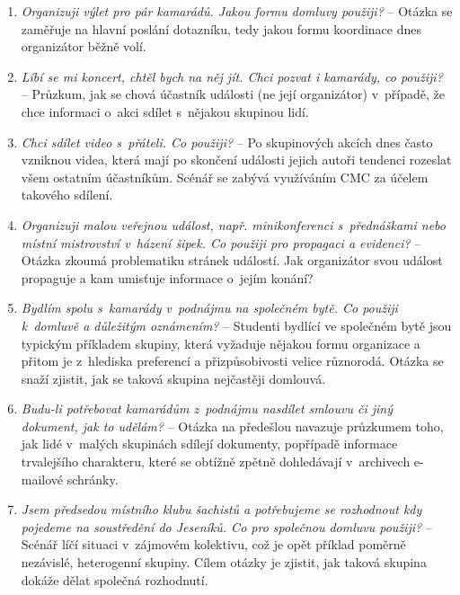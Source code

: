 \documentclass[12pt,oneside,final]{fithesis2}
\begin{document}
\begin{enumerate}
    \item \emph{Organizuji výlet pro pár kamarádů. Jakou formu domluvy použiji?} --
        Otázka se zaměřuje na hlavní poslání dotazníku, tedy jakou formu koordinace dnes organizátor běžně volí.

    \item \emph{Líbí se mi koncert, chtěl bych na něj jít. Chci pozvat i kamarády, co použiji?} --
        Průzkum, jak se chová účastník události (ne její organizátor) v~případě, že chce informaci o~akci sdílet s~nějakou skupinou lidí.

    \item \emph{Chci sdílet video s~přáteli. Co použiji?} --
        Po skupinových akcích dnes často vzniknou videa, která mají po skončení události jejich autoři tendenci rozeslat všem ostatním účastníkům. Scénář se zabývá využíváním CMC za účelem takového sdílení.

    \item \emph{Organizuji malou veřejnou událost, např. minikonferenci s~přednáškami nebo místní mistrovství v~házení šipek. Co použiji pro propagaci a evidenci?} --
        Otázka zkoumá problematiku stránek událostí. Jak organizátor svou událost propaguje a kam umisťuje informace o~jejím konání?

    \item \emph{Bydlím spolu s~kamarády v~podnájmu na společném bytě. Co použiji k~domluvě a důležitým oznámením?} --
        Studenti bydlící ve společném bytě jsou typickým příkladem skupiny, která vyžaduje nějakou formu organizace a přitom je z~hlediska preferencí a přizpůsobivosti velice různorodá. Otázka se snaží zjistit, jak se taková skupina nejčastěji domlouvá.

    \item \emph{Budu-li potřebovat kamarádům z~podnájmu nasdílet smlouvu či jiný dokument, jak to udělám?} --
        Otázka na předešlou navazuje průzkumem toho, jak lidé v~malých skupinách sdílejí dokumenty, popřípadě informace trvalejšího charakteru, které se obtížně zpětně dohledávají v~archivech e-mailové schránky.

    \item \emph{Jsem předsedou místního klubu šachistů a potřebujeme se rozhodnout kdy pojedeme na soustředění do Jeseníků. Co pro společnou domluvu použiji?} --
        Scénář líčí situaci v~zájmovém kolektivu, což je opět příklad poměrně nezávislé, heterogenní skupiny. Cílem otázky je zjistit, jak taková skupina dokáže dělat společná rozhodnutí.


\end{enumerate}
\end{document}
